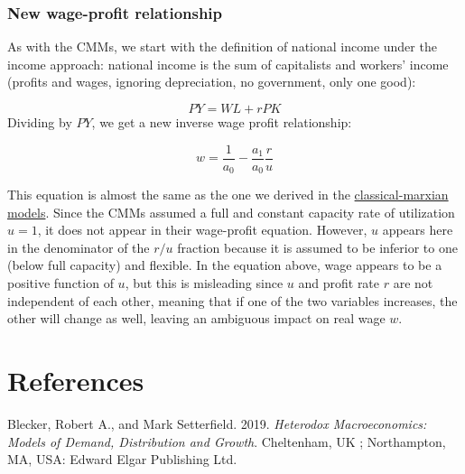 \documentclass[
  letterpaper,
  DIV=11,
  numbers=noendperiod]{scrreprt}
\newlength{\cslhangindent}
\newlength{\cslentryspacingunit} %
\newenvironment{CSLReferences}[2] %
 {%
  \setlength{\parindent}{0pt}
  \ifodd #1
  \let\oldpar\par
  \def\par{\hangindent=\cslhangindent\oldpar}
  \fi
  \setlength{\parskip}{#2\cslentryspacingunit}
 }%
 {}
\begin{document}
\hypertarget{new-wage-profit-relationship}{%
\subsection{New wage-profit
relationship}\label{new-wage-profit-relationship}}

As with the CMMs, we start with the definition of national income under
the income approach: national income is the sum of capitalists and
workers' income (profits and wages, ignoring depreciation, no
government, only one good):

\[PY = WL + rPK\] Dividing by \(PY\), we get a new inverse wage profit
relationship:

\[w = \frac{1}{a_0} - \frac{a_1}{a_0} \frac{r}{u}\]

This equation is almost the same as the one we derived in the
\href{https://jeylal.github.io/myblog/economics_series/classical-marxian\%20model/classical-marxian\%20model.html\#basis-of-the-model}{classical-marxian
models}. Since the CMMs assumed a full and constant capacity rate of
utilization \(u = 1\), it does not appear in their wage-profit equation.
However, \(u\) appears here in the denominator of the \(r/u\) fraction
because it is assumed to be inferior to one (below full capacity) and
flexible. In the equation above, wage appears to be a positive function
of \(u\), but this is misleading since \(u\) and profit rate \(r\) are
not independent of each other, meaning that if one of the two variables
increases, the other will change as well, leaving an ambiguous impact on
real wage \(w\).


\hypertarget{references}{%
\chapter*{References}\label{references}}


\hypertarget{refs}{}
\begin{CSLReferences}{1}{0}
\leavevmode{}%
Blecker, Robert A., and Mark Setterfield. 2019. \emph{Heterodox
Macroeconomics: Models of Demand, Distribution and Growth}. Cheltenham,
{UK} ; Northampton, {MA}, {USA}: Edward Elgar Publishing Ltd.

\end{CSLReferences}
\end{document}
